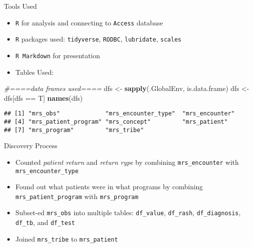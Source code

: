 \documentclass[ignorenonframetext,]{beamer}
\newenvironment{Shaded}{\begin{snugshade}}{\end{snugshade}}
\newcommand{\KeywordTok}[1]{\textcolor[rgb]{0.13,0.29,0.53}{\textbf{{#1}}}}
\newcommand{\StringTok}[1]{\textcolor[rgb]{0.31,0.60,0.02}{{#1}}}
\newcommand{\CommentTok}[1]{\textcolor[rgb]{0.56,0.35,0.01}{\textit{{#1}}}}
\newcommand{\NormalTok}[1]{{#1}}
\providecommand{\tightlist}{%
\setlength{\itemsep}{0pt}\setlength{\parskip}{0pt}}
\begin{document}
\begin{frame}[fragile]{Tools Used}

\begin{itemize}
\item
  \texttt{R} for analysis and connecting to \texttt{Access} database
\item
  \texttt{R} packages used: \texttt{tidyverse}, \texttt{RODBC},
  \texttt{lubridate}, \texttt{scales}
\item
  \texttt{R\ Markdown} for presentation
\item
  Tables Used:
\end{itemize}

\begin{Shaded}
\begin{Highlighting}[]
\CommentTok{#====data frames used====}
\NormalTok{dfs <-}\StringTok{ }\KeywordTok{sapply}\NormalTok{(.GlobalEnv, is.data.frame)}
\NormalTok{dfs <-}\StringTok{ }\NormalTok{dfs[dfs ==}\StringTok{ }\NormalTok{T]}
\KeywordTok{names}\NormalTok{(dfs)}
\end{Highlighting}
\end{Shaded}

\begin{verbatim}
## [1] "mrs_obs"             "mrs_encounter_type"  "mrs_encounter"      
## [4] "mrs_patient_program" "mrs_concept"         "mrs_patient"        
## [7] "mrs_program"         "mrs_tribe"
\end{verbatim}

\end{frame}

\begin{frame}[fragile]{Discovery Process}

\begin{itemize}
\tightlist
\item
  Counted \emph{patient return} and \emph{return rype} by combining
  \texttt{mrs\_encounter} with \texttt{mrs\_encounter\_type}
\item
  Found out what patients were in what programs by combining
  \texttt{mrs\_patient\_program} with \texttt{mrs\_program}
\item
  Subset-ed \texttt{mrs\_obs} into multiple tables: \texttt{df\_value},
  \texttt{df\_rash}, \texttt{df\_diagnosis}, \texttt{df\_tb}, and
  \texttt{df\_test}
\item
  Joined \texttt{mrs\_tribe} to \texttt{mrs\_patient}
\end{itemize}

\end{frame}
\end{document}
